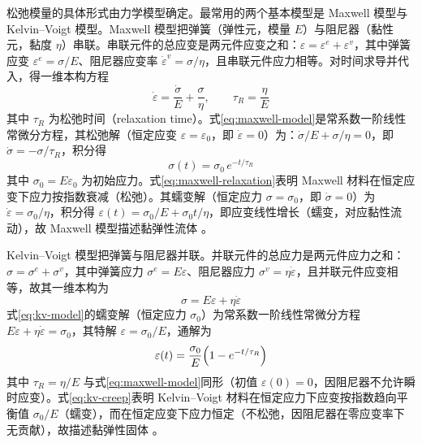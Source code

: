 松弛模量的具体形式由力学模型确定。最常用的两个基本模型是 Maxwell 模型与 Kelvin--Voigt 模型。Maxwell 模型把弹簧（弹性元，模量 $E$）与阻尼器（黏性元，黏度 $\eta$）串联。串联元件的总应变是两元件应变之和：$\varepsilon=\varepsilon^{e}+\varepsilon^{v}$，其中弹簧应变 $\varepsilon^{e}=\sigma/E$、阻尼器应变率 $\dot{\varepsilon}^{v}=\sigma/\eta$，且串联元件应力相等。对时间求导并代入，得一维本构方程
\begin{equation}
  \dot{\varepsilon}=\frac{\dot{\sigma}}{E}+\frac{\sigma}{\eta},
  \qquad
  \tau_{R}=\frac{\eta}{E}
  \label{eq:maxwell-model}
\end{equation}
其中 $\tau_{R}$ 为松弛时间（relaxation time）。式\eqref{eq:maxwell-model}是常系数一阶线性常微分方程，其松弛解（恒定应变 $\varepsilon=\varepsilon_{0}$，即 $\dot{\varepsilon}=0$）为：$\dot{\sigma}/E+\sigma/\eta=0$，即 $\dot{\sigma}=-\sigma/\tau_{R}$，积分得
\begin{equation}
  \sigma(t)=\sigma_{0}\,e^{-t/\tau_{R}}
  \label{eq:maxwell-relaxation}
\end{equation}
其中 $\sigma_{0}=E\varepsilon_{0}$ 为初始应力。式\eqref{eq:maxwell-relaxation}表明 Maxwell 材料在恒定应变下应力按指数衰减（松弛）。其蠕变解（恒定应力 $\sigma=\sigma_{0}$，即 $\dot{\sigma}=0$）为 $\dot{\varepsilon}=\sigma_{0}/\eta$，积分得 $\varepsilon(t)=\sigma_{0}/E+\sigma_{0}t/\eta$，即应变线性增长（蠕变，对应黏性流动），故 Maxwell 模型描述黏弹性流体 \cite{Christensen1982}。

Kelvin--Voigt 模型把弹簧与阻尼器并联。并联元件的总应力是两元件应力之和：$\sigma=\sigma^{e}+\sigma^{v}$，其中弹簧应力 $\sigma^{e}=E\varepsilon$、阻尼器应力 $\sigma^{v}=\eta\dot{\varepsilon}$，且并联元件应变相等，故其一维本构为
\begin{equation}
  \sigma=E\varepsilon+\eta\dot{\varepsilon}
  \label{eq:kv-model}
\end{equation}
式\eqref{eq:kv-model}的蠕变解（恒定应力 $\sigma_{0}$）为常系数一阶线性常微分方程 $E\varepsilon+\eta\dot{\varepsilon}=\sigma_{0}$，其特解 $\varepsilon=\sigma_{0}/E$，通解为
\begin{equation}
  \varepsilon(t)=\frac{\sigma_{0}}{E}\Bigl(1-e^{-t/\tau_{R}}\Bigr)
  \label{eq:kv-creep}
\end{equation}
其中 $\tau_{R}=\eta/E$ 与式\eqref{eq:maxwell-model}同形（初值 $\varepsilon(0)=0$，因阻尼器不允许瞬时应变）。式\eqref{eq:kv-creep}表明 Kelvin--Voigt 材料在恒定应力下应变按指数趋向平衡值 $\sigma_{0}/E$（蠕变），而在恒定应变下应力恒定（不松弛，因阻尼器在零应变率下无贡献），故描述黏弹性固体 \cite{Christensen1982}。

